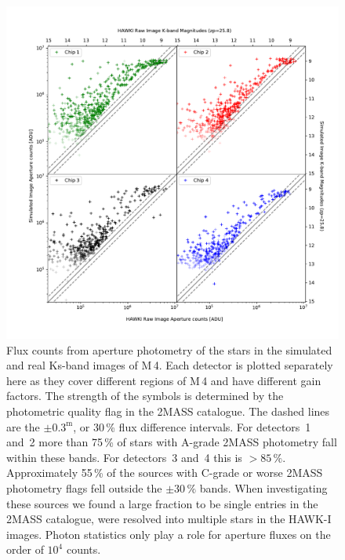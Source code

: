 \begin{figure}

    \centering
    \includegraphics[width=\textwidth]{images/HAWKI_vs_HAWKado_counts}
    
    \caption{Flux counts from aperture photometry of the stars in the simulated and real Ks-band images of M\,4. Each detector is plotted separately here as they cover different regions of M\,4 and have different gain factors. The strength of the symbols is determined by the photometric quality flag in the 2MASS catalogue. The dashed lines are the $\pm 0.3^\mathrm{m}$, or 30\,\% flux difference intervals. For detectors~1 and~2  more than 75\,\% of stars with A-grade 2MASS photometry fall within these bands. For detectors~3 and~4 this is $>85\,\%$. Approximately 55\,\% of the sources with C-grade or worse 2MASS photometry flags fell outside the $\pm 30\,\%$ bands. When investigating these sources we found a large fraction to be single entries in the 2MASS catalogue, were resolved into multiple stars in the HAWK-I images. Photon statistics only play a role for aperture fluxes on the order of $10^{4}$ counts.}
    \label{fig:HAWKI_hawkado_flux_comparison}
    
\end{figure}

